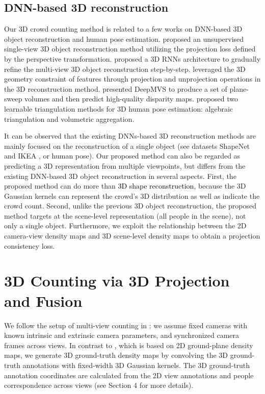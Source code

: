 \documentclass[letterpaper]{article}
\newcommand{\zq}[1]{\textcolor{black}{#1}} %
\newcommand{\citep}{\cite}
\newcommand{\citealp}[1]{\citeauthor{#1} \citeyear{#1}}
\begin{document}
\subsection{DNN-based 3D reconstruction}

Our 3D crowd counting method is related to a few works on DNN-based 3D object reconstruction and human pose estimation. \citealp{yan2016perspective} proposed an unsupervised single-view 3D object reconstruction method utilizing the projection loss defined by the perspective transformation.
\citealp{choy20163d} proposed a 3D RNNs architecture to gradually refine the multi-view 3D object reconstruction step-by-step.
\citealp{kar2017learning} leveraged the 3D geometry constraint of features through projection and unprojection operations in the 3D reconstruction method.
\citealp{huang2018deepmvs} presented DeepMVS to %
 produce a set of plane-sweep volumes and then predict high-quality disparity maps.
\citealp{Iskakov2019Learnable} proposed two learnable triangulation methods for 3D human pose estimation: algebraic triangulation and volumetric aggregation.

\par
It can be observed that the existing DNNs-based 3D reconstruction methods are mainly focused on the reconstruction of a single object (see datasets ShapeNet \citep{chang2015shapenet} and IKEA \citep{lpt2013ikea}, or human pose). Our proposed method can also be regarded as predicting a 3D representation from multiple viewpoints, but differs from the existing DNN-based 3D object reconstruction in several aspects. First, the proposed method can do more than \zq{3D shape reconstruction}, because the 3D Gaussian kernels can represent the crowd's 3D distribution as well as indicate the crowd count. Second, unlike the previous 3D object reconstruction, the proposed method targets at the scene-level representation (all people in the scene), not only a single object. Furthermore, we exploit the relationship between the 2D camera-view density maps and 3D scene-level density maps to obtain a projection consistency loss.



\section{3D Counting via 3D Projection and Fusion}

We follow the setup of multi-view counting in \citealp{zhang2019wide}: we assume fixed cameras with known intrinsic and extrinsic camera parameters, and synchronized camera frames across views. In contrast to \citealp{zhang2019wide}, which is based on 2D ground-plane density maps, we generate 3D ground-truth density maps %
by convolving the 3D ground-truth annotations with fixed-width 3D Gaussian kernels. The 3D ground-truth annotation coordinates are calculated from the 2D view annotations and people correspondence across views (see Section 4 for more details).
\end{document}
